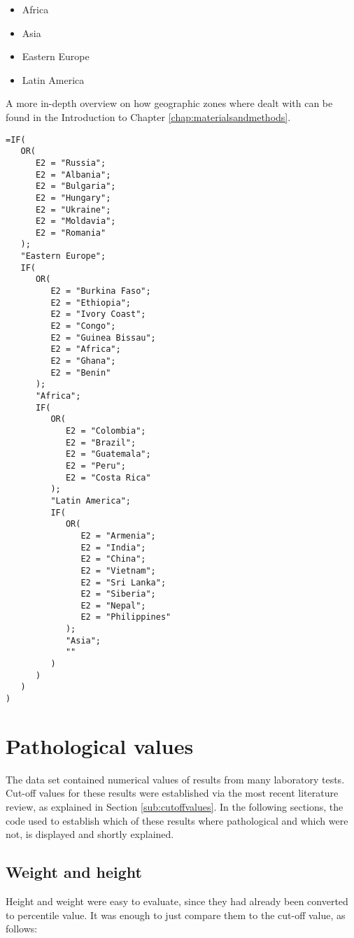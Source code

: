 \begin{itemize}
    \item Africa
    \item Asia
    \item Eastern Europe
    \item Latin America
\end{itemize}

A more in-depth overview on how geographic zones where dealt with can be found in the Introduction to Chapter \ref{chap:materialsandmethods}.

\begin{lstlisting}
=IF(
   OR(
      E2 = "Russia";
      E2 = "Albania";
      E2 = "Bulgaria";
      E2 = "Hungary";
      E2 = "Ukraine";
      E2 = "Moldavia";
      E2 = "Romania"
   );
   "Eastern Europe";
   IF(
      OR(
         E2 = "Burkina Faso";
         E2 = "Ethiopia";
         E2 = "Ivory Coast";
         E2 = "Congo";
         E2 = "Guinea Bissau";
         E2 = "Africa";
         E2 = "Ghana";
         E2 = "Benin"
      );
      "Africa";
      IF(
         OR(
            E2 = "Colombia";
            E2 = "Brazil";
            E2 = "Guatemala";
            E2 = "Peru";
            E2 = "Costa Rica"
         );
         "Latin America";
         IF(
            OR(
               E2 = "Armenia";
               E2 = "India";
               E2 = "China";
               E2 = "Vietnam";
               E2 = "Sri Lanka";
               E2 = "Siberia";
               E2 = "Nepal";
               E2 = "Philippines"
            );
            "Asia";
            ""
         )
      )
   )
)
\end{lstlisting}

\section{Pathological values}\label{asec:pathologicalvalues}
The data set contained numerical values of results from many laboratory tests. Cut-off values for these results were established via the most recent literature review, as explained in Section \ref{sub:cutoffvalues}. In the following sections, the code used to establish which of these results where pathological and which were not, is displayed and shortly explained.

\subsection{Weight and height}\label{asub:patweightandheight}
Height and weight were easy to evaluate, since they had already been converted to percentile value. It was enough to just compare them to the cut-off value, as follows:

